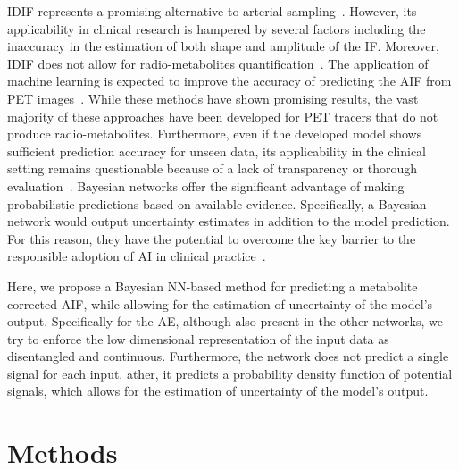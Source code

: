         \gls{IDIF} represents a promising alternative to arterial sampling~\parencite{Zanotti-Fregonara2011}. However, its applicability in clinical research is hampered by several factors including the inaccuracy in the estimation of both shape and amplitude of the \gls{IF}. Moreover, \gls{IDIF} does not allow for radio-metabolites quantification~\parencite{Sari2018Non-invasive11C-SB201745}. The application of machine learning is expected to improve the accuracy of predicting the \gls{AIF} from \gls{PET} images~\parencite{Kuttner2020, Ferrante2022PhysicallyImaging}. While these methods have shown promising results, the vast majority of these approaches have been developed for \gls{PET} tracers that do not produce radio-metabolites. Furthermore, even if the developed model shows sufficient prediction accuracy for unseen data, its applicability in the clinical setting remains questionable because of a lack of transparency or thorough evaluation~\parencite{Salahuddin2022TransparencyMethods}. Bayesian networks offer the significant advantage of making probabilistic predictions based on available evidence. Specifically, a Bayesian network would output uncertainty estimates in addition to the model prediction. For this reason, they have the potential to overcome the key barrier to the responsible adoption of \gls{AI} in clinical practice~\parencite{Prabhudesai2023LoweringAI}. 
        
        Here, we propose a Bayesian \gls{NN}-based method for predicting a metabolite corrected \gls{AIF}, while allowing for the estimation of uncertainty of the model's output. Specifically for the \gls{AE}, although also present in the other networks, we try to enforce the low dimensional representation of the input data as disentangled and continuous. Furthermore, the network does not predict a single signal for each input. ather, it predicts a probability density function of potential signals, which allows for the estimation of uncertainty of the model's output.
        
    \section{Methods} \label{sec:a_bayesian_neural_network-based_method_for_the_extraction_of_a_metabolite_corrected_arterial_input_function_from_dynamic_pbr28_pet_appendix_methods}
